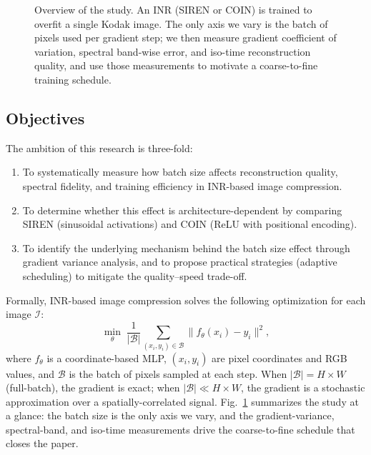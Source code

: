 \documentclass[a4paper,oneside,11pt,english]{scrartcl}
\begin{document}
\begin{figure}[H]
\caption{Overview of the study.  An INR (SIREN or COIN) is trained to overfit
a single Kodak image.  The only axis we vary is the batch of pixels used per
gradient step; we then measure gradient coefficient of variation, spectral
band-wise error, and iso-time reconstruction quality, and use those
measurements to motivate a coarse-to-fine training schedule.}
\label{fig:overview}
\end{figure}

\subsection{Objectives}

The ambition of this research is three-fold:

\begin{enumerate}
    \item To systematically measure how batch size affects reconstruction
          quality, spectral fidelity, and training efficiency in INR-based
          image compression.
    \item To determine whether this effect is architecture-dependent by
          comparing SIREN (sinusoidal activations) and COIN (ReLU with
          positional encoding).
    \item To identify the underlying mechanism behind the batch size effect
          through gradient variance analysis, and to propose practical
          strategies (adaptive scheduling) to mitigate the quality--speed
          trade-off.
\end{enumerate}

Formally, INR-based image compression solves the following optimization for each
image $\mathcal{I}$:
\begin{equation}
    \min_\theta \;\frac{1}{|\mathcal{B}|} \sum_{(x_i,y_i) \in \mathcal{B}}
    \bigl\| f_\theta(x_i) - y_i \bigr\|^2,
    \label{eq:objective}
\end{equation}
where $f_\theta$ is a coordinate-based MLP, $(x_i, y_i)$ are pixel coordinates
and RGB values, and $\mathcal{B}$ is the batch of pixels sampled at each step.
When $|\mathcal{B}| = H \times W$ (full-batch), the gradient is exact; when
$|\mathcal{B}| \ll H \times W$, the gradient is a stochastic approximation
over a spatially-correlated signal.  Fig.~\ref{fig:overview} summarizes the
study at a glance: the batch size is the only axis we vary, and the
gradient-variance, spectral-band, and iso-time measurements drive the
coarse-to-fine schedule that closes the paper.
\end{document}
